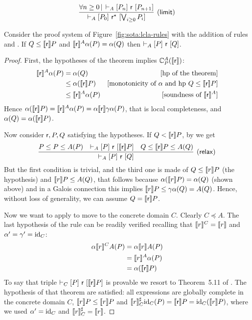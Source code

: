\[\infer[(\mathsf{limit})]
{\lcl{A}{P_0}{\regr^\kstar}{\bigvee_{i \ge 0}P_i}}
{\forall n \ge 0 \svert \lcl{A}{P_n}{\regr}{P_{n+1}}}
\]
\begin{theorem}\label{th:lcla:refinement-rule-completeness}
	Consider the proof system of Figure~\ref{fig:sota:lcla-rules} with the addition of rules  and . If $Q \le \llbracket\mathsf{r}\rrbracket P$ and $\llbracket\mathsf{r}\rrbracket^A \alpha(P) = \alpha(Q)$ then $\vdash_{A}\nobreak[P]~\mathsf{r}~[Q]$.
\end{theorem}
\begin{proof}
	First, the hypotheses of the theorem implies $\mathbb{C}^{A}_{P}(\llbracket\mathsf{r}\rrbracket)$:
	\begin{align*}
		\llbracket\mathsf{r}\rrbracket^A \alpha(P) &= \alpha(Q) &[\text{hp of the theorem}]\\
		&\le \alpha(\llbracket\mathsf{r}\rrbracket P) &[\text{monotonicity of } \alpha \text{ and hp } Q \le \llbracket\mathsf{r}\rrbracket P]\\
		&\le \llbracket\mathsf{r}\rrbracket^A \alpha(P) &[\text{soundness of } \llbracket\mathsf{r}\rrbracket^{A}]
	\end{align*}
	Hence $\alpha(\llbracket\mathsf{r}\rrbracket P) = \llbracket\mathsf{r}\rrbracket^A \alpha(P) = \alpha \llbracket\mathsf{r}\rrbracket \gamma \alpha(P)$, that is local completeness, and $\alpha(Q) = \alpha(\llbracket\mathsf{r}\rrbracket P)$.
	
	Now consider $\mathsf{r}, P, Q$ satisfying the hypotheses. If $Q < \llbracket\mathsf{r}\rrbracket P$, by  we get
	\[
	\infer[(\mathsf{relax})]
	{\lcl{A}{P}{\regr}{Q}}
	{P \le P \le A(P) & \lcl{A}{P}{\regr}{\denot{\regr} P} & Q \leq \denot{\regr} P \le A(Q)}
	\]
	But the first condition is trivial, and the third one is made of $Q \le \llbracket r\rrbracket P$ (the hypothesis) and $\llbracket r\rrbracket P \le A(Q)$, that follows because $\alpha(\llbracket r\rrbracket P) = \alpha(Q)$ (shown above) and in a Galois connection this implies $\llbracket r\rrbracket P \le \gamma \alpha(Q) = A(Q)$. Hence, without loss of generality, we can assume $Q = \llbracket\mathsf{r}\rrbracket P$.
	
	Now we want to apply  to move to the concrete domain $C$. Clearly $C \preceq A$. The last hypothesis of the rule can be readily verified recalling that $\llbracket r\rrbracket^{C} = \llbracket r\rrbracket$ and $\alpha' = \gamma' = \text{id}_C$:
	\begin{align*}
		\alpha \llbracket r\rrbracket^{C} A(P) &= \alpha \llbracket r\rrbracket A(P) \\
		&= \llbracket r\rrbracket^{A} \alpha(P) \\
		&= \alpha(\llbracket\mathsf{r}\rrbracket P)
	\end{align*}
	To say that triple $\vdash_{C}\nobreak[P]~\mathsf{r}~[\llbracket\mathsf{r}\rrbracket P]$ is provable we resort to Theorem~5.11 of \cite{BGGR21}. The hypothesis of that theorem are satisfied: all expressions are globally complete in the concrete domain $C$, $\llbracket r\rrbracket P \le \llbracket r\rrbracket P$ and $\llbracket r\rrbracket^{\sharp}_C \text{id}_C(P) = \llbracket\mathsf{r}\rrbracket P = \text{id}_C(\llbracket r\rrbracket P)$, where we used $\alpha' = \text{id}_C$ and $\llbracket r\rrbracket^{\sharp}_C = \llbracket r\rrbracket$.
	

\end{proof}
